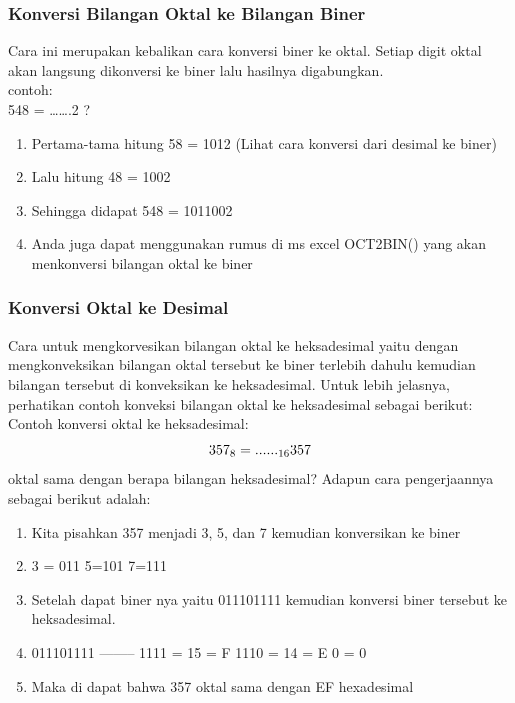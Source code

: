 \subsubsection{Konversi Bilangan Oktal ke Bilangan Biner}
Cara ini merupakan kebalikan cara konversi biner ke oktal. Setiap digit oktal akan langsung dikonversi ke biner lalu hasilnya digabungkan.
\\contoh:
\\548 = …….2 ?
\\
\begin{enumerate}
\item Pertama-tama hitung 58 = 1012 (Lihat cara konversi dari desimal ke biner)
\item Lalu hitung 48 = 1002
\item Sehingga didapat 548 = 1011002
\item Anda juga dapat menggunakan rumus di ms excel OCT2BIN() yang akan menkonversi bilangan oktal ke biner
\end{enumerate}

\subsubsection{Konversi Oktal ke Desimal}
Cara untuk mengkorvesikan bilangan oktal ke heksadesimal yaitu dengan mengkonveksikan bilangan oktal tersebut ke biner terlebih dahulu kemudian bilangan tersebut di konveksikan ke heksadesimal. Untuk lebih jelasnya, perhatikan contoh konveksi bilangan oktal ke heksadesimal sebagai berikut:
\\ Contoh konversi oktal ke heksadesimal:
\begin{equation}
\\357_{8}=......_{16} 357 \end{equation}oktal sama dengan berapa bilangan heksadesimal?
Adapun cara pengerjaannya sebagai berikut adalah:
\begin{enumerate}
\item Kita pisahkan 357 menjadi 3, 5, dan 7 kemudian konversikan ke biner 
\item 3 = 011 5=101 7=111
\item Setelah dapat biner nya yaitu 011101111 kemudian konversi biner tersebut ke heksadesimal. 
\item 011101111 -------- 1111 = 15 = F 1110 = 14 = E 0 = 0
\item Maka di dapat bahwa 357 oktal sama dengan EF hexadesimal 
\end{enumerate}


